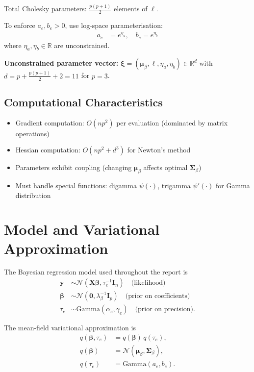 \documentclass[11pt,a4paper]{article}
\newcommand{\R}{\mathbb{R}}
\newcommand{\N}{\mathcal{N}}
\begin{document}
Total Cholesky parameters: $\frac{p(p+1)}{2}$ elements of $\bm{\ell}$.

To enforce $a_e, b_e > 0$, use log-space parameterisation:
\begin{align}
a_e &= e^{\eta_a}, \quad b_e = e^{\eta_b}
\end{align}
where $\eta_a, \eta_b \in \R$ are unconstrained.

\textbf{Unconstrained parameter vector:} $\bm{\xi} = (\bm{\mu}_\beta, \bm{\ell}, \eta_a, \eta_b) \in \R^d$ with $d = p + \frac{p(p+1)}{2} + 2 = 11$ for $p=3$.

\subsection*{Computational Characteristics}

\begin{itemize}
\item Gradient computation: $O(np^2)$ per evaluation (dominated by matrix operations)
\item Hessian computation: $O(np^2 + d^3)$ for Newton's method
\item Parameters exhibit coupling (changing $\bm{\mu}_\beta$ affects optimal $\bm{\Sigma}_\beta$)
\item Must handle special functions: digamma $\psi(\cdot)$, trigamma $\psi'(\cdot)$ for Gamma distribution
\end{itemize}
\newpage
\section*{Model and Variational Approximation}

The Bayesian regression model used throughout the report is
\begin{align}
\bm{y} &\sim \N(\bm{X}\bm{\beta}, \tau_e^{-1} \bm{I}_n) \quad \text{(likelihood)}\\
\bm{\beta} &\sim \N(\bm{0}, \lambda_\beta^{-1} \bm{I}_p) \quad \text{(prior on coefficients)}\\
\tau_e &\sim \text{Gamma}(\alpha_e, \gamma_e) \quad \text{(prior on precision)}.
\end{align}

The mean-field variational approximation is
\begin{align}
q(\bm{\beta}, \tau_e) &= q(\bm{\beta}) \, q(\tau_e),\\
q(\bm{\beta}) &= \N(\bm{\mu}_\beta, \bm{\Sigma}_\beta),\\
q(\tau_e) &= \text{Gamma}(a_e, b_e).
\end{align}
\end{document}
